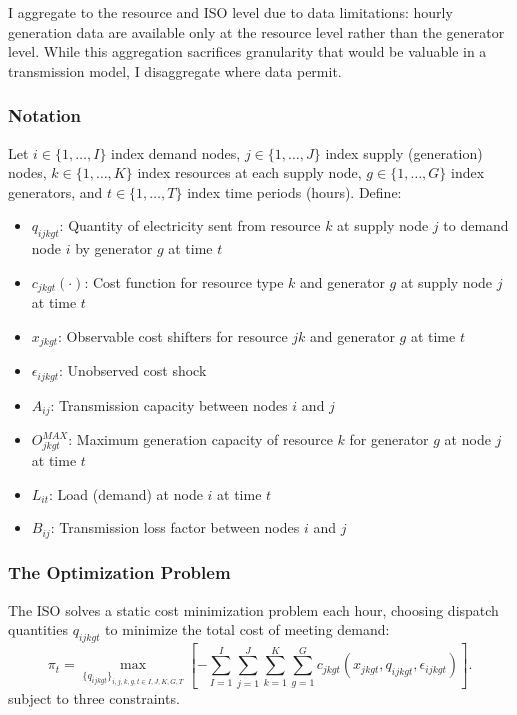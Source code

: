 \documentclass[12pt]{article}
\begin{document}
I aggregate to the resource and ISO level due to data limitations: hourly generation data are available only at the resource level rather than the generator level. While this aggregation sacrifices granularity that would be valuable in a transmission model, I disaggregate where data permit.

\subsubsection{Notation}

Let $i \in \{1, \ldots, I\}$ index demand nodes, $j \in \{1, \ldots, J\}$ index supply (generation) nodes, $k \in \{1, \ldots, K\}$ index resources at each supply node, $g \in \{1, \ldots, G\}$ index generators, and $t \in \{1, \ldots, T\}$ index time periods (hours). Define:
\begin{itemize}
    \item $q_{ijkgt}$: Quantity of electricity sent from resource $k$ at supply node $j$ to demand node $i$ by generator $g$ at time $t$
    \item $c_{jkgt}(\cdot)$: Cost function for resource type $k$ and generator $g$ at supply node $j$ at time $t$
    \item $x_{jkgt}$: Observable cost shifters for resource $jk$ and generator $g$ at time $t$
    \item $\epsilon_{ijkgt}$: Unobserved cost shock
    \item $A_{ij}$: Transmission capacity between nodes $i$ and $j$
    \item $O_{jkgt}^{MAX}$: Maximum generation capacity of resource $k$ for generator $g$ at node $j$ at time $t$
    \item $L_{it}$: Load (demand) at node $i$ at time $t$
    \item $B_{ij}$: Transmission loss factor between nodes $i$ and $j$
\end{itemize}

\subsubsection{The Optimization Problem}

The ISO solves a static cost minimization problem each hour, choosing dispatch quantities $q_{ijkgt}$ to minimize the total cost of meeting demand:
\begin{equation} \pi_{t}=\max_{\{q_{ijkgt}\}_{i,j,k,g,t\in I,J,K,G,T}} \left[- \sum_{I=1}^I \sum_{j=1}^J \sum_{k=1}^K \sum_{g=1}^G c_{jkgt}(x_{jkgt},q_{ijkgt},\epsilon_{ijkgt})\right]. \end{equation}
subject to three constraints.
\end{document}
